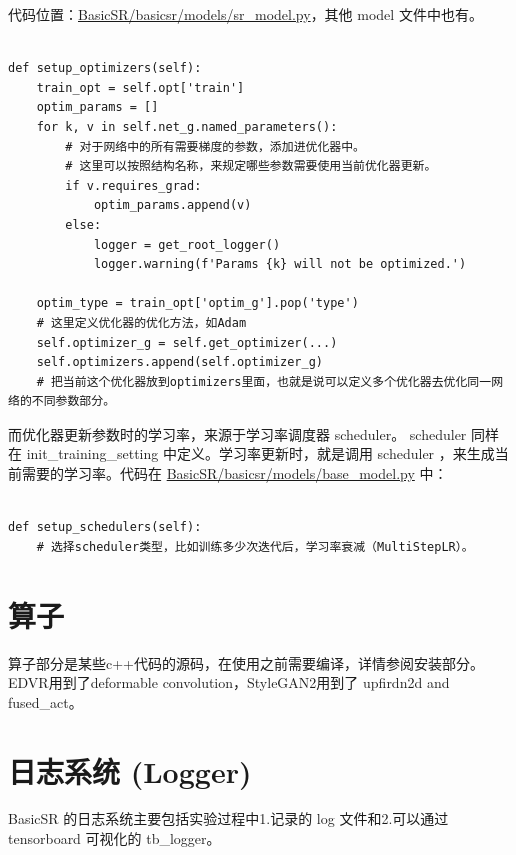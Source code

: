 \documentclass[../main.tex]{subfiles}
\begin{document}
代码位置：\href{https://github.com/XPixelGroup/BasicSR/blob/master/basicsr/models/sr_model.py}{BasicSR/basicsr/models/sr\_model.py}，其他 model 文件中也有。

\begin{verbatim}

def setup_optimizers(self):
    train_opt = self.opt['train']
    optim_params = []
    for k, v in self.net_g.named_parameters():
        # 对于网络中的所有需要梯度的参数，添加进优化器中。
        # 这里可以按照结构名称，来规定哪些参数需要使用当前优化器更新。
        if v.requires_grad:
            optim_params.append(v)
        else:
            logger = get_root_logger()
            logger.warning(f'Params {k} will not be optimized.')

    optim_type = train_opt['optim_g'].pop('type')
    # 这里定义优化器的优化方法，如Adam
    self.optimizer_g = self.get_optimizer(...)
    self.optimizers.append(self.optimizer_g)
    # 把当前这个优化器放到optimizers里面，也就是说可以定义多个优化器去优化同一网络的不同参数部分。
\end{verbatim}

而优化器更新参数时的学习率，来源于学习率调度器 scheduler。 scheduler 同样在 init\_training\_setting 中定义。学习率更新时，就是调用 scheduler ，来生成当前需要的学习率。代码在 \href{https://github.com/XPixelGroup/BasicSR/blob/master/basicsr/models/base_model.py}{BasicSR/basicsr/models/base\_model.py} 中：

\begin{verbatim}

def setup_schedulers(self):
    # 选择scheduler类型，比如训练多少次迭代后，学习率衰减（MultiStepLR）。
\end{verbatim}



\section{算子}

算子部分是某些c++代码的源码，在使用之前需要编译，详情参阅安装部分。
EDVR用到了deformable convolution，StyleGAN2用到了 upfirdn2d and fused\_act。

\section{日志系统 (Logger)}

BasicSR 的日志系统主要包括实验过程中1.记录的 log 文件和2.可以通过 tensorboard 可视化的 tb\_logger。
\end{document}
